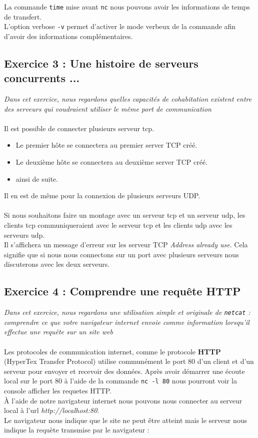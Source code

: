 La commande \texttt{time} mise avant \texttt{nc} nous pouvons avoir les informations de temps de transfert.\\
L'option verbose \texttt{-v} permet d'activer le mode verbeux de la commande afin d'avoir des informations complémentaires.
\subsection{Exercice 3 : Une histoire de serveurs concurrents ...}
\textit{Dans cet exercice, nous regardons quelles capacités de cohabitation existent entre des serveurs qui voudraient utiliser le même port de communication}
\\\\
Il est possible de connecter plusieurs serveur tcp.
\begin{itemize}
  \item Le premier hôte se connectera au premier server TCP créé.
  \item Le deuxième hôte se connectera au deuxième server TCP créé.
  \item ainsi de suite.
\end{itemize}
Il en est de même pour la connexion de plusieurs serveurs UDP.
\\\\
Si nous souhaitons faire un montage avec un serveur tcp et un serveur udp, les clients tcp communiqueraient avec le serveur tcp et les clients udp avec les serveurs udp.\\
Il s'affichera un message d'erreur sur les serveur TCP \textit{Address already use}. Cela signifie que si nous nous connectons sur un port avec plusieurs serveurs nous discuterons avec les deux serveurs.

\subsection{Exercice 4 : Comprendre une requête HTTP}
\textit{Dans cet exercice, nous regardons une utilisation simple et originale de \texttt{netcat} : comprendre ce que votre navigateur internet envoie comme information lorsqu’il effectue une requête sur un site web}
\\\\
Les protocoles de communication internet, comme le protocole \textbf{HTTP} (HyperTex Transfer Protocol) utilise communément le port 80 d'un client et d'un serveur pour envoyer et recevoir des données.
Après avoir démarrer une écoute local sur le port 80 à l'aide de la commande \texttt{nc -l 80} nous pourront voir la console afficher les requetes HTTP.\\
À l'aide de notre navigateur internet nous pouvons nous connecter au serveur local à l'url \textit{http://localhost:80}.\\
Le navigateur nous indique que le site ne peut être atteint mais le serveur nous indique la requète transmise par le navigateur :

